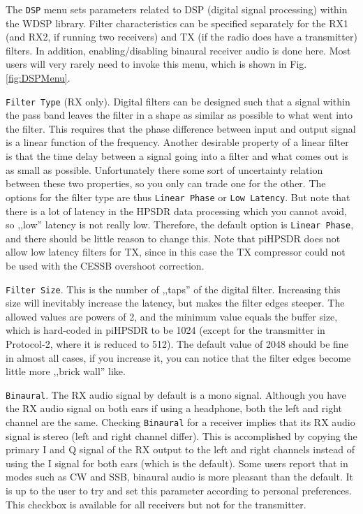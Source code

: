 \documentclass[12pt]{book}
\def\rett#1{\texttt{\color{red}#1}}
\def\bltt#1{\texttt{\color{blue}#1}}
\def\pH{pi\-HPSDR\xspace}
\begin{document}
The \bltt{DSP} menu sets parameters related to DSP (digital signal processing)
within the WDSP library.
Filter characteristics can be specified separately for the RX1 (and RX2, if
running two receivers) and TX (if the radio does have a transmitter)
filters. In addition, enabling/disabling binaural receiver audio
is done here.  Most users will
very rarely need to invoke this menu, which is shown
in Fig. \ref{fig:DSPMenu}.

\rett{Filter Type} (RX only). Digital filters can be designed such that a signal within the
pass band leaves the filter in a shape as similar as possible
to what went into the filter. This requires that the phase
difference between input and output signal is a linear
function of the frequency. Another desirable property
of a linear filter is that the time delay between a signal
going into a filter and what comes out is as small as
possible. Unfortunately there some sort of uncertainty
relation between these two properties, so you only can
trade one for the other. The options for the filter type
are thus \rett{Linear Phase} or \rett{Low Latency}.
But note that there is a lot of latency in the HPSDR data
processing which you cannot avoid, so ,,low'' latency
is not really low. Therefore, the default option
is \rett{Linear Phase}, and there should be little reason
to change this. Note that \pH does not allow low latency
filters for TX, since in this case the TX compressor
could not be used with the CESSB overshoot correction.

\rett{Filter Size}. This is the number of ,,taps'' of the digital
filter. Increasing this size will inevitably increase the latency,
but makes the filter edges steeper. The allowed values are
powers of 2, and the minimum value equals the buffer size, which
is hard-coded in \pH to be 1024 (except for the transmitter in Protocol-2,
where it is reduced to 512). The default value of 2048 should be
fine in almost all cases, if you increase it, you can notice that
the filter edges become little more ,,brick wall'' like.

\rett{Binaural}. The RX audio signal by default is a mono signal. Although
you have the RX audio signal on both ears if using a headphone, both the
left and right channel are the same. Checking \rett{Binaural} for a
receiver implies that its RX audio signal is stereo (left and right channel
differ). This is accomplished by copying the primary I and Q signal of the
RX output to the left and right channels instead of using the I signal
for both ears (which is the default). Some users report that in modes
such as CW and SSB, binaural audio is more pleasant than the default.
It is up to the user to try and set this parameter according to personal
preferences. This checkbox is available for all receivers but not for the
transmitter.
\end{document}
